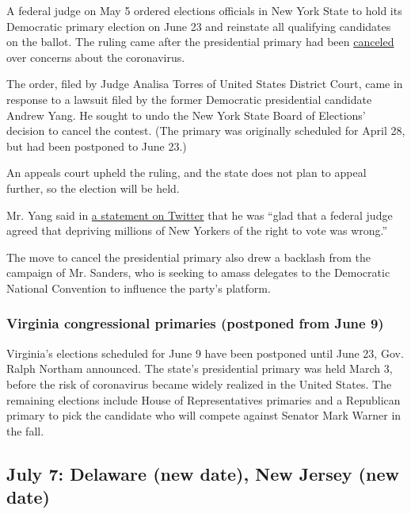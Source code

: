 A federal judge on May 5 ordered elections officials in New York State
to hold its Democratic primary election on June 23 and reinstate all
qualifying candidates on the ballot. The ruling came after the
presidential primary had been
\href{https://www.nytimes.com/2020/04/27/us/politics/democratic-primary-canceled-coronavirus.html}{canceled}
over concerns about the coronavirus.

The order, filed by Judge Analisa Torres of United States District
Court, came in response to a lawsuit filed by the former Democratic
presidential candidate Andrew Yang. He sought to undo the New York State
Board of Elections' decision to cancel the contest. (The primary was
originally scheduled for April 28, but had been postponed to June 23.)

An appeals court upheld the ruling, and the state does not plan to
appeal further, so the election will be held.

Mr. Yang said in
\href{https://twitter.com/AndrewYang/status/1257826412851011584}{a
statement on Twitter} that he was ``glad that a federal judge agreed
that depriving millions of New Yorkers of the right to vote was wrong.''

The move to cancel the presidential primary also drew a backlash from
the campaign of Mr. Sanders, who is seeking to amass delegates to the
Democratic National Convention to influence the party's platform.

\hypertarget{virginia-congressional-primaries-postponed-from-june-9}{%
\subsubsection{\texorpdfstring{\textbf{Virginia congressional primaries
(postponed from June
9)}}{Virginia congressional primaries (postponed from June 9)}}\label{virginia-congressional-primaries-postponed-from-june-9}}

Virginia's elections scheduled for June 9 have been postponed until June
23, Gov. Ralph Northam announced. The state's presidential primary was
held March 3, before the risk of coronavirus became widely realized in
the United States. The remaining elections include House of
Representatives primaries and a Republican primary to pick the candidate
who will compete against Senator Mark Warner in the fall.

\hypertarget{july-7-delaware-new-date-new-jersey-new-date}{%
\subsection{July 7: Delaware (new date), New Jersey (new
date)}\label{july-7-delaware-new-date-new-jersey-new-date}}

